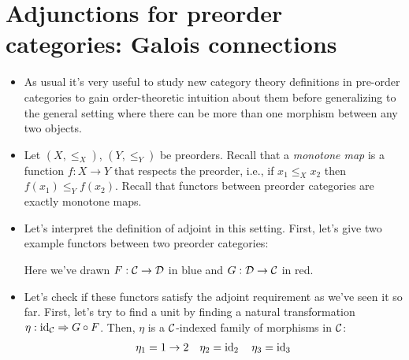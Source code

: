 \section{Adjunctions for preorder categories: Galois connections}
\begin{itemize}
  \item As usual it's very useful to study new category theory definitions in 
  pre-order categories to gain order-theoretic intuition about them before 
  generalizing to the general setting where there can be more than one morphism 
  between any two objects.
  
  \item Let $(X, \le_X)$, $(Y, \le_Y)$ be preorders. Recall that a \emph{monotone map}
  is a function $f : X \to Y$ that respects the preorder, i.e., 
  if $x_1 \le_X x_2$ then $f(x_1) \le_Y f(x_2)$. Recall that functors between 
  preorder categories are exactly monotone maps.

  \item Let's interpret the definition of adjoint in this setting. First, 
  let's give two example functors between two preorder categories:


  Here we've drawn $F : \mathcal C \to \mathcal D$ in blue and $G : \mathcal D \to \mathcal C$ in red.

  \item Let's check if these functors satisfy the adjoint requirement as we've seen it 
  so far. First, let's try to find a unit by finding a natural transformation
  $\eta : \operatorname{id}_\mathcal C \Rightarrow G \circ F$. 
  Then, $\eta$ is a $\mathcal C$-indexed family of morphisms in $\mathcal C$:
  \begin{align*}
    \eta_1 = 1 \to 2 \quad \eta_2 = \operatorname{id}_2 \quad \eta_3 = \operatorname{id}_3
  \end{align*}


\end{itemize}
